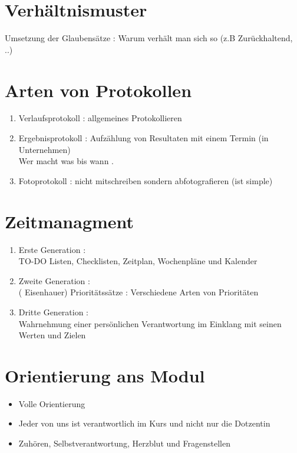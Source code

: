\documentclass[11pt,a4paper]{article}
\begin{document}
  	 \section*{Verhältnismuster}
  Umsetzung der Glaubensätze : Warum verhält man sich so (z.B  Zurückhaltend, ..)
\section*{Arten von Protokollen}
\begin{enumerate}
\item Verlaufsprotokoll : allgemeines Protokollieren
\item Ergebnisprotokoll : Aufzählung von Resultaten mit einem Termin (in Unternehmen)\\
Wer macht was bis wann .
\item Fotoprotokoll : nicht mitschreiben sondern abfotografieren (ist simple)
\end{enumerate}

\section*{Zeitmanagment}
\begin{enumerate}
\item Erste Generation : \\ TO-DO Listen, Checklisten, Zeitplan, Wochenpläne und Kalender
\item Zweite Generation : \\ ( Eisenhauer) Prioritätssätze : Verschiedene Arten von Prioritäten 
\item Dritte Generation : \\ Wahrnehmung einer persönlichen Verantwortung im Einklang mit seinen Werten und Zielen
\end{enumerate}

\section*{Orientierung ans Modul}
\begin{itemize}
\item Volle Orientierung 
\item  Jeder von uns ist verantwortlich im Kurs und nicht nur die Dotzentin
\item Zuhören, Selbstverantwortung, Herzblut und Fragenstellen
\end{itemize} 
\end{document}

